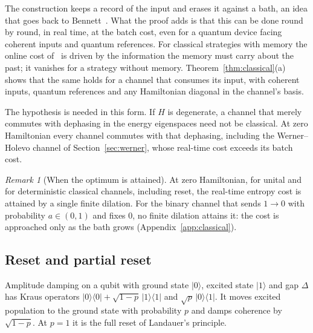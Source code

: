 \documentclass[11pt]{article}
\theoremstyle{definition}
\theoremstyle{remark}
\newtheorem{remark}{Remark}
\begin{document}
The construction keeps a record of the input and erases it against a bath, an idea that goes back to Bennett~\cite{Bennett73}. What the proof adds is that this can be done round by round, in real time, at the batch cost, even for a quantum device facing coherent inputs and quantum references. For classical strategies with memory the online cost of~\cite{Thompson25} is driven by the information the memory must carry about the past; it vanishes for a strategy without memory. Theorem~\ref{thm:classical}(a) shows that the same holds for a channel that consumes its input, with coherent inputs, quantum references and any Hamiltonian diagonal in the channel's basis.

The hypothesis is needed in this form. If $H$ is degenerate, a channel that merely commutes with dephasing in the energy eigenspaces need not be classical. At zero Hamiltonian every channel commutes with that dephasing, including the Werner--Holevo channel of Section~\ref{sec:werner}, whose real-time cost exceeds its batch cost.

\begin{remark}[When the optimum is attained]
At zero Hamiltonian, for unital and for deterministic classical channels, including reset, the real-time entropy cost is attained by a single finite dilation. For the binary channel that sends $1\to0$ with probability $a\in(0,1)$ and fixes $0$, no finite dilation attains it: the cost is approached only as the bath grows (Appendix~\ref{app:classical}).
\end{remark}

\subsection{Reset and partial reset}

Amplitude damping on a qubit with ground state $|0\rangle$, excited state $|1\rangle$ and gap $\Delta$ has Kraus operators $|0\rangle\langle0|+\sqrt{1-p}\,|1\rangle\langle1|$ and $\sqrt p\,|0\rangle\langle1|$. It moves excited population to the ground state with probability $p$ and damps coherence by $\sqrt{1-p}$. At $p=1$ it is the full reset of Landauer's principle.
\end{document}
